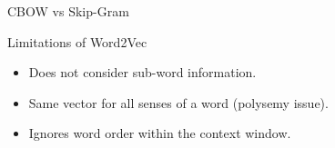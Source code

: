 \begin{frame}[allowframebreaks]{CBOW vs Skip-Gram}
    \begin{figure}
        \centering
    \end{figure}
\end{frame}

\begin{frame}{Limitations of Word2Vec}
    \begin{itemize}
        \item Does not consider sub-word information.
        \item Same vector for all senses of a word (polysemy issue).
        \item Ignores word order within the context window.
    \end{itemize}
\end{frame}